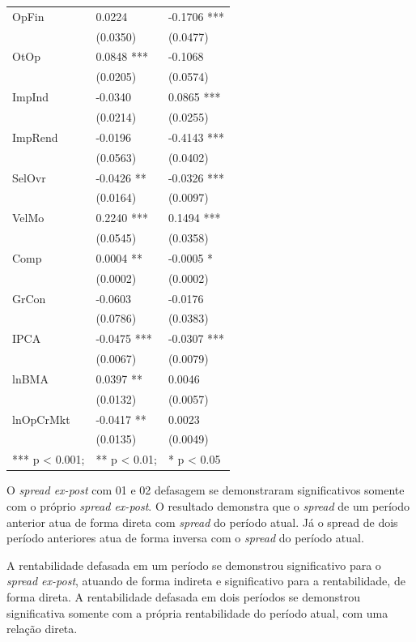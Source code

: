 \documentclass[
  12pt,
  12pt,
  openright,
  oneside,
  a4paper,
  chapter=TITLE,
  section=TITLE,
  subsection=TITLE,
  subsubsection=TITLE,
  english,
  portugues,
  sumario=tradicional]{abntex2}
\begin{document}
\begin{longtable}[]{@{}lll@{}}
OpFin & 0.0224 & -0.1706 *** \\
& (0.0350) & (0.0477) \\
OtOp & 0.0848 *** & -0.1068 \\
& (0.0205) & (0.0574) \\
ImpInd & -0.0340 & 0.0865 *** \\
& (0.0214) & (0.0255) \\
ImpRend & -0.0196 & -0.4143 *** \\
& (0.0563) & (0.0402) \\
SelOvr & -0.0426 ** & -0.0326 *** \\
& (0.0164) & (0.0097) \\
VelMo & 0.2240 *** & 0.1494 *** \\
& (0.0545) & (0.0358) \\
Comp & 0.0004 ** & -0.0005 * \\
& (0.0002) & (0.0002) \\
GrCon & -0.0603 & -0.0176 \\
& (0.0786) & (0.0383) \\
IPCA & -0.0475 *** & -0.0307 *** \\
& (0.0067) & (0.0079) \\
lnBMA & 0.0397 ** & 0.0046 \\
& (0.0132) & (0.0057) \\
lnOpCrMkt & -0.0417 ** & 0.0023 \\
& (0.0135) & (0.0049) \\
*** p \textless{} 0.001; & ** p \textless{} 0.01; & * p \textless{} 0.05 \\
\bottomrule
\end{longtable}

\vspace{1mm}

\label{tb:pvargmm}
\vspace{-2mm}
\vspace{20pt}

\parindent 1.50cm

\vspace{20pt}

O \emph{spread ex-post} com 01 e 02 defasagem se demonstraram significativos somente com o próprio \emph{spread ex-post}. O resultado demonstra que o \emph{spread} de um período anterior atua de forma direta com \emph{spread} do período atual. Já o spread de dois período anteriores atua de forma inversa com o \emph{spread} do período atual.

A rentabilidade defasada em um período se demonstrou significativo para o \emph{spread ex-post}, atuando de forma indireta e significativo para a rentabilidade, de forma direta. A rentabilidade defasada em dois períodos se demonstrou significativa somente com a própria rentabilidade do período atual, com uma relação direta.
\end{document}
